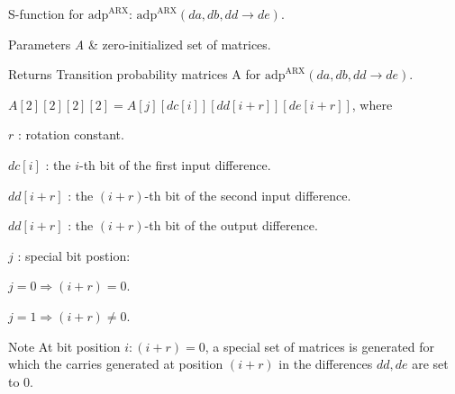 \-S-\/function for $\mathrm{adp}^{\mathrm{ARX}}$\-: $\mathrm{adp}^{\mathrm{ARX}}(da,db,dd \rightarrow de)$.


\begin{DoxyParams}{\-Parameters}
{\em \-A} & zero-\/initialized set of matrices. \\
\hline
\end{DoxyParams}
\begin{DoxyReturn}{\-Returns}
\-Transition probability matrices \-A for $\mathrm{adp}^{\mathrm{ARX}}(da,db,dd \rightarrow de)$.
\end{DoxyReturn}
$A[2][2][2][2] = A[j][dc[i]][dd[i+r]][de[i+r]]$, where


\begin{DoxyItemize}
\item $r$ \-: rotation constant.
\item $dc[i]$ \-: the $i$-\/th bit of the first input difference.
\item $dd[i+r]$ \-: the $(i+r)$-\/th bit of the second input difference.
\item $dd[i+r]$ \-: the $(i+r)$-\/th bit of the output difference.
\item $j$ \-: special bit postion\-:
\begin{DoxyEnumerate}
\item $ j = 0 \Rightarrow (i+r) = 0$.
\item $ j = 1 \Rightarrow (i+r) \neq 0$.
\end{DoxyEnumerate}
\end{DoxyItemize}

\begin{DoxyNote}{\-Note}
\-At bit position $i: (i+r) = 0$, a special set of matrices is generated for which the carries generated at position $(i+r)$ in the differences $dd,de$ are set to 0. 
\end{DoxyNote}


